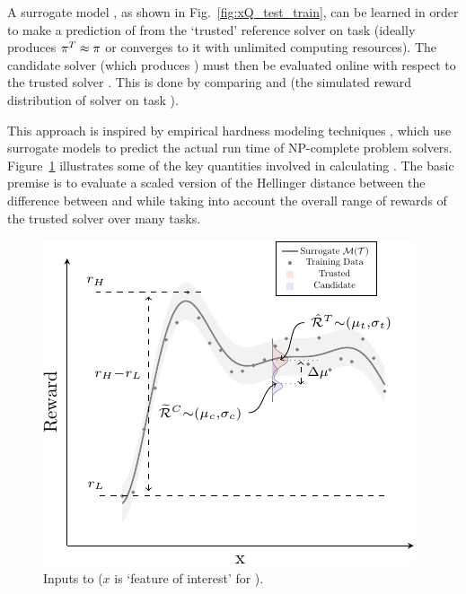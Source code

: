 A surrogate model \surrogate{}, as shown in Fig.~\ref{fig:xQ_test_train}, can be learned in order to make a prediction \rwdtrustpredict{} of \rwdtrust{} from the `trusted' reference solver \solvetrust{} on task \task{} (ideally \solvetrust{} produces $\mathcal{\pi}^T \approx \mathcal{\pi}$ or converges to it with unlimited computing resources). The candidate solver \solvecand{} (which produces \policycand) must then be evaluated online with respect to the trusted solver \solvetrust{}. This is done by comparing \rwdtrustpredict{} and \rwdcandsim{} (the simulated reward distribution of solver \solvecand{} on task \task). 

This approach is inspired by empirical hardness modeling techniques \cite{Leyton-Brown2009-yr}, which use surrogate models to predict the actual run time of NP-complete problem solvers. 
Figure~\ref{fig:xQ_v2} illustrates some of the key quantities involved in calculating \xQ{}. The basic premise is to evaluate a scaled version of the Hellinger distance between the difference between \rwdtrust{} and \rwdcand{} while taking into account the overall range of rewards of the trusted solver over many tasks. 
\begin{figure}[tb]
    \centering
    \includegraphics[width=0.65\linewidth]{Figures/xQ_v2.pdf}
    \caption{Inputs to \xQ{} ($x$ is `feature of interest' for \task). 
    }
    \label{fig:xQ_v2}
    \vspace{-0.5cm}
\end{figure}


